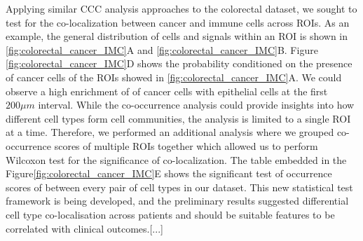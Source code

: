Applying similar CCC analysis approaches to the colorectal dataset, we sought to test for the co-localization between cancer and immune cells across ROIs. As an example, the general distribution of cells and signals within an ROI is shown in \ref{fig:colorectal_cancer_IMC}A and \ref{fig:colorectal_cancer_IMC}B. Figure \ref{fig:colorectal_cancer_IMC}D shows the probability conditioned on the presence of cancer cells of the ROIs showed in \ref{fig:colorectal_cancer_IMC}A. We could observe a high enrichment of of cancer cells with epithelial cells at the first $200\mu m$ interval. While the co-occurrence analysis could provide insights into how different cell types form cell communities, the analysis is limited to a single ROI at a time. Therefore, we performed an additional analysis where we grouped co-occurrence scores of multiple ROIs together which allowed us to perform Wilcoxon test for the significance of co-localization. The table embedded in the Figure\ref{fig:colorectal_cancer_IMC}E shows the significant test of occurrence scores of between every pair of cell types in our dataset. This new statistical test framework is being developed, and the preliminary results suggested differential cell type co-localisation across patients and should be suitable features to be correlated with clinical outcomes.[...]

